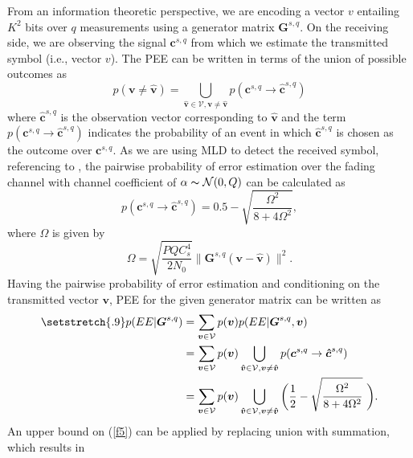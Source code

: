 \documentclass{ieeeaccess}
\begin{document}
From an information theoretic perspective, we are encoding a vector $v$ entailing $K^2$ bits over $q$ measurements using a generator matrix $\boldsymbol{G}^{s,q}$. On the receiving side, we are observing the signal $\boldsymbol{c}^{s,q}$ from which we estimate the transmitted symbol (i.e., vector $v$). The PEE can be written in terms of the union of possible outcomes as
\begin{equation} \label{f2}
p(\boldsymbol{v}\neq \boldsymbol{\hat{v}}) = \bigcup_{\boldsymbol{\hat{v}} \in \mathcal{V} ,\boldsymbol{v}\neq \boldsymbol{\hat{v}}} p(\boldsymbol{c}^{s,q}\rightarrow \boldsymbol{\hat{c}}^{s,q})
\end{equation}
where $\boldsymbol{\hat{c}}^{s,q}$ is the observation vector corresponding to $\boldsymbol{\hat{v}}$ and the term $p(\boldsymbol{c}^{s,q}\rightarrow \boldsymbol{\hat{c}}^{s,q})$ indicates the probability of an event in which $\boldsymbol{\hat{c}}^{s,q}$ is chosen as the outcome over $\boldsymbol{c}^{s,q}$. As we are using MLD to detect the received symbol, referencing to \cite{s1}, the pairwise probability of error estimation over the fading channel with channel coefficient of $\alpha \thicksim \mathcal{N}(0,Q)$ can be calculated as
\begin{equation} \label{f3}
p(\boldsymbol{c}^{s,q}\rightarrow \boldsymbol{\hat{c}}^{s,q}) = 0.5-\sqrt{\dfrac{\Omega^2}{8+4\Omega^2}},
\end{equation}
where $\Omega$ is given by
\begin{equation} \label{f4}
\Omega = \sqrt{\dfrac{PQC_s^4}{2N_0}}\|\boldsymbol{G}^{s,q}(\boldsymbol{v}- \boldsymbol{\hat{v}})  \|^2.
\end{equation}
Having the pairwise probability of error estimation and conditioning on the transmitted vector $\boldsymbol{v}$, PEE for the given generator matrix can be written as
\begin{align} \label{f5}
\setstretch{.9}
p(EE|\boldsymbol{G}^{s,q})&= \sum_{\boldsymbol{v}\in \mathcal{V}} p(\boldsymbol{v})p(EE|\boldsymbol{G}^{s,q},\boldsymbol{v})\nonumber \\
&=\sum_{\boldsymbol{v}\in \mathcal{V}} p(\boldsymbol{v})\bigcup_{\boldsymbol{\hat{v}} \in \mathcal{V} ,\boldsymbol{v}\neq \boldsymbol{\hat{v}}} p(\boldsymbol{c}^{s,q}\rightarrow \boldsymbol{\hat{c}}^{s,q})\nonumber \\
&=\sum_{\boldsymbol{v}\in \mathcal{V}} p(\boldsymbol{v})\bigcup_{\boldsymbol{\hat{v}} \in \mathcal{V} ,\boldsymbol{v}\neq \boldsymbol{\hat{v}}}\bigg(\frac{1}{2}-\sqrt{\dfrac{\Omega^2}{8+4\Omega^2}}\  \bigg).
\end{align}
An upper bound on (\ref{f5}) can be applied by replacing union with summation, which results in
\end{document}
